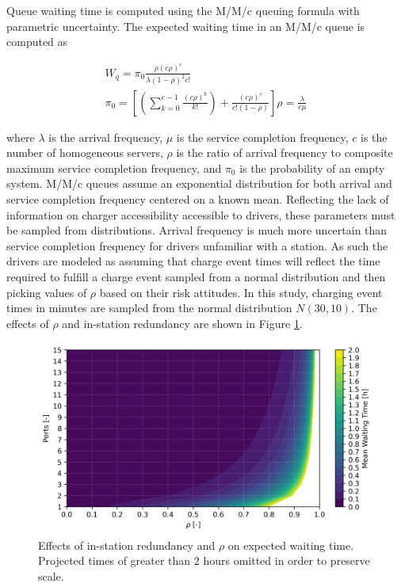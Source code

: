 \documentclass[11pt]{article}
\begin{document}
\begin{multicols}{2}
Queue waiting time is computed using the M/M/c queuing formula with parametric uncertainty. The expected waiting time in an M/M/c queue is computed as

\begin{gather}
	W_q = \pi_0\frac{\rho(c\rho)^c}{\lambda(1-\rho)^2c!}\\
	\pi_0=\left[\left(\sum_{k = 0}^{c - 1}\frac{(c\rho)^k}{k!}\right) + \frac{(c\rho)^c}{c!(1 - \rho)}\right]
	\rho = \frac{\lambda}{c\mu}
\end{gather}

where $\lambda$ is the arrival frequency, $\mu$ is the service completion frequency, $c$ is the number of homogeneous servers, $\rho$ is the ratio of arrival frequency to composite maximum service completion frequency, and $\pi_0$ is the probability of an empty system. M/M/c queues assume an exponential distribution for both arrival and service completion frequency centered on a known mean. Reflecting the lack of information on charger accessibility accessible to drivers, these parameters must be sampled from distributions. Arrival frequency is much more uncertain than service completion frequency for drivers unfamiliar with a station. As such the drivers are modeled as assuming that charge event times will reflect the time required to fulfill a charge event sampled from a normal distribution and then picking values of $\rho$ based on their risk attitudes. In this study, charging event times in minutes are sampled from the normal distribution $N(30, 10)$. The effects of $\rho$ and in-station redundancy are shown in Figure \ref{fig:reduncancy_rho_wq}.

\begin{figure}[H]
	\centering
	\includegraphics[width = \linewidth]{figs/waiting_time_rho_ports.png}
	\caption{Effects of in-station redundancy and $\rho$ on expected waiting time. Projected times of greater than 2 hours omitted in order to preserve scale.}
	\label{fig:reduncancy_rho_wq}
\end{figure}


\end{multicols}
\end{document}
